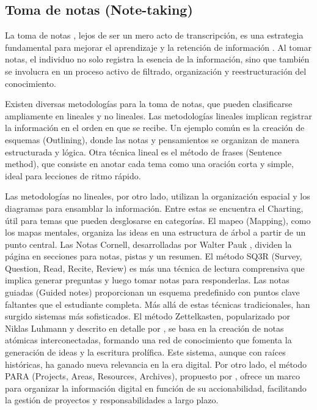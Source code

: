 \subsection{Toma de notas (Note-taking)}
La toma de notas , lejos de ser un mero acto de transcripción, es una estrategia fundamental para mejorar el aprendizaje y la retención de información \citep{jansenIntegrativeReviewCognitive2017}. Al tomar notas, el individuo no solo registra la esencia de la información, sino que también se involucra en un proceso activo de filtrado, organización y reestructuración del conocimiento.

Existen diversas metodologías para la toma de notas, que pueden clasificarse ampliamente en lineales y no lineales.
Las metodologías lineales implican registrar la información en el orden en que se recibe. Un ejemplo común es la creación de esquemas (Outlining), donde las notas y pensamientos se organizan de manera estructurada y lógica. Otra técnica lineal es el método de frases (Sentence method), que consiste en anotar cada tema como una oración corta y simple, ideal para lecciones de ritmo rápido.

Las metodologías no lineales, por otro lado, utilizan la organización espacial y los diagramas para ensamblar la información. Entre estas se encuentra el Charting, útil para temas que pueden desglosarse en categorías. El mapeo (Mapping), como los mapas mentales, organiza las ideas en una estructura de árbol a partir de un punto central. Las Notas Cornell, desarrolladas por Walter Pauk \citep{paukHowStudyCollege2010}, dividen la página en secciones para notas, pistas y un resumen. El método SQ3R (Survey, Question, Read, Recite, Review) es más una técnica de lectura comprensiva que implica generar preguntas y luego tomar notas para responderlas. Las notas guiadas (Guided notes) proporcionan un esquema predefinido con puntos clave faltantes que el estudiante completa.
Más allá de estas técnicas tradicionales, han surgido sistemas más sofisticados. El método Zettelkasten, popularizado por Niklas Luhmann y descrito en detalle por \cite{ahrensHowTakeSmart2017}, se basa en la creación de notas atómicas interconectadas, formando una red de conocimiento que fomenta la generación de ideas y la escritura prolífica. Este sistema, aunque con raíces históricas, ha ganado nueva relevancia en la era digital. Por otro lado, el método PARA (Projects, Areas, Resources, Archives), propuesto por \cite{forteBuildingSecondBrain2022}, ofrece un marco para organizar la información digital en función de su accionabilidad, facilitando la gestión de proyectos y responsabilidades a largo plazo.

